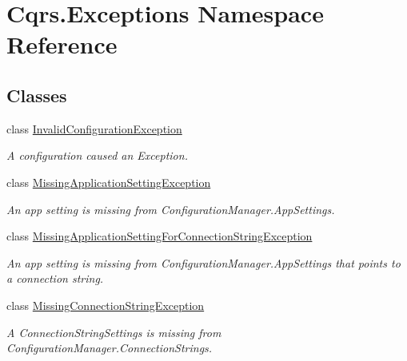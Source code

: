 \hypertarget{namespaceCqrs_1_1Exceptions}{}\section{Cqrs.\+Exceptions Namespace Reference}
\label{namespaceCqrs_1_1Exceptions}
\subsection*{Classes}
\begin{DoxyCompactItemize}
\item 
class \hyperlink{classCqrs_1_1Exceptions_1_1InvalidConfigurationException}{Invalid\+Configuration\+Exception}
\begin{DoxyCompactList}\small\item\em A configuration caused an Exception. \end{DoxyCompactList}\item 
class \hyperlink{classCqrs_1_1Exceptions_1_1MissingApplicationSettingException}{Missing\+Application\+Setting\+Exception}
\begin{DoxyCompactList}\small\item\em An app setting is missing from Configuration\+Manager.\+App\+Settings. \end{DoxyCompactList}\item 
class \hyperlink{classCqrs_1_1Exceptions_1_1MissingApplicationSettingForConnectionStringException}{Missing\+Application\+Setting\+For\+Connection\+String\+Exception}
\begin{DoxyCompactList}\small\item\em An app setting is missing from Configuration\+Manager.\+App\+Settings that points to a connection string. \end{DoxyCompactList}\item 
class \hyperlink{classCqrs_1_1Exceptions_1_1MissingConnectionStringException}{Missing\+Connection\+String\+Exception}
\begin{DoxyCompactList}\small\item\em A Connection\+String\+Settings is missing from Configuration\+Manager.\+Connection\+Strings. \end{DoxyCompactList}\end{DoxyCompactItemize}
